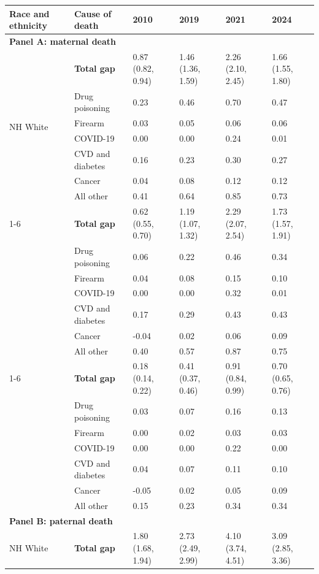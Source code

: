 \begin{threeparttable}
\begin{tabular}{llllll}
\toprule
Race and ethnicity & Cause of death & 2010 & 2019 & 2021 & 2024 \\
\midrule
\multicolumn{6}{l}{\textbf{Panel A: maternal death}} \\
\multirow{7}{*}{NH White} & \textbf{Total gap} & 0.87 (0.82, 0.94) & 1.46 (1.36, 1.59) & 2.26 (2.10, 2.45) & 1.66 (1.55, 1.80) \\
 & Drug poisoning & 0.23 & 0.46 & 0.70 & 0.47 \\
 & Firearm & 0.03 & 0.05 & 0.06 & 0.06 \\
 & COVID-19 & 0.00 & 0.00 & 0.24 & 0.01 \\
 & CVD and diabetes & 0.16 & 0.23 & 0.30 & 0.27 \\
 & Cancer & 0.04 & 0.08 & 0.12 & 0.12 \\
 & All other & 0.41 & 0.64 & 0.85 & 0.73 \\
\cmidrule(lr){1-6}
\multirow{7}{*}{NH Black} & \textbf{Total gap} & 0.62 (0.55, 0.70) & 1.19 (1.07, 1.32) & 2.29 (2.07, 2.54) & 1.73 (1.57, 1.91) \\
 & Drug poisoning & 0.06 & 0.22 & 0.46 & 0.34 \\
 & Firearm & 0.04 & 0.08 & 0.15 & 0.10 \\
 & COVID-19 & 0.00 & 0.00 & 0.32 & 0.01 \\
 & CVD and diabetes & 0.17 & 0.29 & 0.43 & 0.43 \\
 & Cancer & -0.04 & 0.02 & 0.06 & 0.09 \\
 & All other & 0.40 & 0.57 & 0.87 & 0.75 \\
\cmidrule(lr){1-6}
\multirow{7}{*}{Hispanic} & \textbf{Total gap} & 0.18 (0.14, 0.22) & 0.41 (0.37, 0.46) & 0.91 (0.84, 0.99) & 0.70 (0.65, 0.76) \\
 & Drug poisoning & 0.03 & 0.07 & 0.16 & 0.13 \\
 & Firearm & 0.00 & 0.02 & 0.03 & 0.03 \\
 & COVID-19 & 0.00 & 0.00 & 0.22 & 0.00 \\
 & CVD and diabetes & 0.04 & 0.07 & 0.11 & 0.10 \\
 & Cancer & -0.05 & 0.02 & 0.05 & 0.09 \\
 & All other & 0.15 & 0.23 & 0.34 & 0.34 \\
\midrule
\multicolumn{6}{l}{\textbf{Panel B: paternal death}} \\
\multirow{7}{*}{NH White} & \textbf{Total gap} & 1.80 (1.68, 1.94) & 2.73 (2.49, 2.99) & 4.10 (3.74, 4.51) & 3.09 (2.85, 3.36) \\

\end{tabular}
\end{threeparttable}
